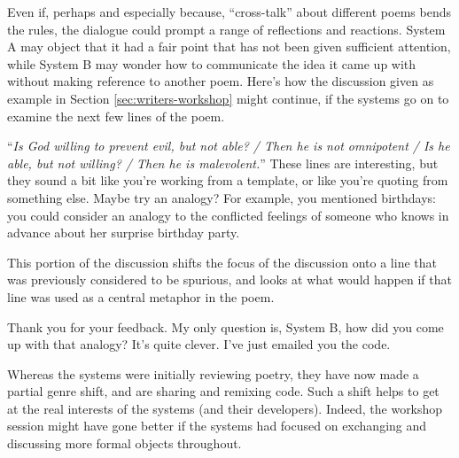 Even if, perhaps and especially because, ``cross-talk'' about
different poems bends the rules, the dialogue could prompt a range of
reflections and reactions.  System A may object that it had a fair
point that has not been given sufficient attention, while System B may
wonder how to communicate the idea it came up with without making
reference to another poem.  Here's how the discussion given as example
in Section \ref{sec:writers-workshop} might continue, if the systems
go on to examine the next few lines of the poem.
\begin{center}
\begin{minipage}{.9\columnwidth}
\begin{dialogue}
 ``\emph{Is God willing to prevent evil, but not able? / Then he is not omnipotent / Is he able, but not willing? / Then he is malevolent.}''
%
 These lines are interesting, but
they sound a bit like you're working from a
template, or like you're quoting from something
else.
%
 Maybe try an analogy?  For example, you mentioned
birthdays: you could consider an analogy to the conflicted feelings of
someone who knows in advance about her surprise birthday party.
\end{dialogue}
\end{minipage}
\end{center}

This portion of the discussion shifts the focus
of the discussion onto a line that was previously
considered to be spurious, and looks at what
would happen if that line was used as a central
metaphor in the poem.

\begin{center}
\begin{minipage}{.9\columnwidth}
\begin{dialogue}
 Thank you for your feedback.  My only question is, System
B, how did you come up with that analogy?  It's quite clever.
%
 I've just emailed you the code.
\end{dialogue}
\end{minipage}
\end{center}

Whereas the systems were initially reviewing poetry, they have now
made a partial genre shift, and are sharing and remixing code.  Such a
shift helps to get at the real interests of the systems (and their
developers).  Indeed, the workshop session might have gone better if
the systems had focused on exchanging and discussing more formal
objects throughout.

